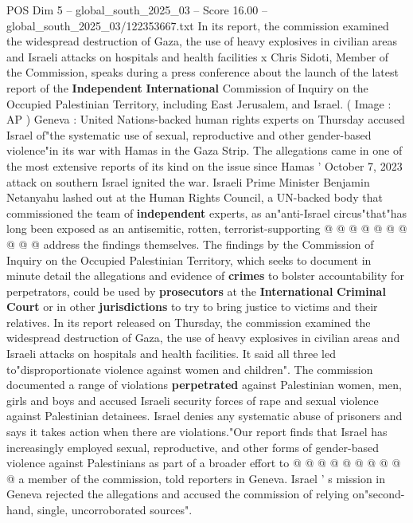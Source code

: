 \begin{textsample}{POS Dim 5 – global\_south\_2025\_03 – Score 16.00 – global\_south\_2025\_03/122353667.txt}  \label{ex:f5_pos_183}
In its report, the commission examined the widespread destruction of Gaza, the use of heavy explosives in civilian areas and Israeli attacks on hospitals and health facilities x Chris Sidoti, Member of the Commission, speaks during a press conference about the launch of the latest report of the \textbf{Independent} \textbf{International} Commission of Inquiry on the Occupied Palestinian Territory, including East Jerusalem, and Israel. ( Image : AP ) Geneva : United Nations-backed human rights experts on Thursday accused Israel of"the systematic use of sexual, reproductive and other gender-based violence"in its war with Hamas in the Gaza Strip.
The allegations came in one of the most extensive reports of its kind on the issue since Hamas ' October 7, 2023 attack on southern Israel ignited the war.
Israeli Prime Minister Benjamin Netanyahu lashed out at the Human Rights Council, a UN-backed body that commissioned the team of \textbf{independent} experts, as an"anti-Israel circus"that"has long been exposed as an antisemitic, rotten, terrorist-supporting @ @ @ @ @ @ @ @ @ @ address the findings themselves.
The findings by the Commission of Inquiry on the Occupied Palestinian Territory, which seeks to document in minute detail the allegations and evidence of \textbf{crimes} to bolster accountability for perpetrators, could be used by \textbf{prosecutors} at the \textbf{International} \textbf{Criminal} \textbf{Court} or in other \textbf{jurisdictions} to try to bring justice to victims and their relatives.
In its report released on Thursday, the commission examined the widespread destruction of Gaza, the use of heavy explosives in civilian areas and Israeli attacks on hospitals and health facilities.
It said all three led to"disproportionate violence against women and children".
The commission documented a range of violations \textbf{perpetrated} against Palestinian women, men, girls and boys and accused Israeli security forces of rape and sexual violence against Palestinian detainees.
Israel denies any systematic abuse of prisoners and says it takes action when there are violations."Our report finds that Israel has increasingly employed sexual, reproductive, and other forms of gender-based violence against Palestinians as part of a broader effort to @ @ @ @ @ @ @ @ @ @ a member of the commission, told reporters in Geneva.
Israel ' s mission in Geneva rejected the allegations and accused the commission of relying on"second-hand, single, uncorroborated sources".

\end{textsample}
